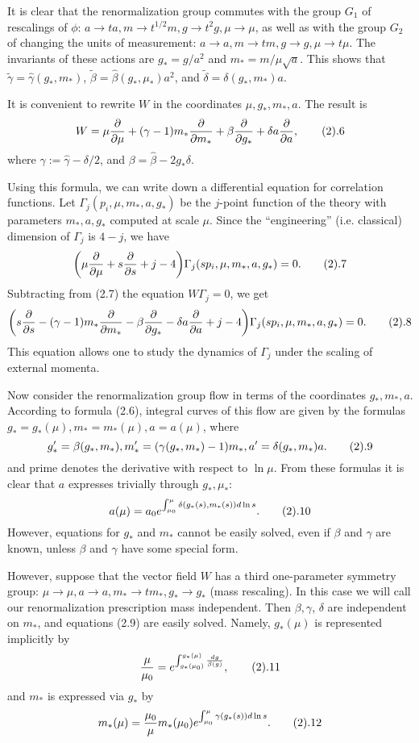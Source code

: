 It is clear that the renormalization group commutes with the group $G_1$ of
rescalings of $\phi$: $a\to ta, m\to t^{1/2}m,g\to t^2 g,\mu\to\mu$, 
as well as with 
the group $G_2$ of changing the units of measurement:
$a\to a,m\to tm,g\to g,\mu\to t\mu$. 
The invariants of these actions are $g_*=g/a^2$ and $m_*=m/\mu\sqrt{a}$. 
This shows that $\tilde\gamma=\hat\gamma(g_*,m_*)$, 
$\tilde\beta=\hat\beta(g_*,\mu_*)a^2$, and
$\tilde\delta=\delta(g_*,m_*)a$. 

It is convenient to rewrite $W$ in the coordinates $\mu,g_*,m_*,a$.
The result is 
$$
W=\mu\frac{\d}{\d\mu}+(\gamma-1) 
m_*\frac{\d}{\d m_*}+\beta
\frac{\d }{\d g_*}
+\delta a\frac{\d}{\d a},\tag 2.6
$$
where $\gamma:=\hat\gamma-\delta/2$, and
$\beta=\hat\beta-2g_*\delta$.

Using this formula, we can write down a differential equation 
for correlation functions.  
Let $\Gamma_j(p_i,\mu,m_*,a,g_*)$ be the $j$-point function
of the theory with parameters $m_*,a,g_*$ computed at scale $\mu$. 
Since the ``engineering'' (i.e. classical) dimension of $\Gamma_j$
is $4-j$, we have
$$
\biggl(\mu\frac{\d}{\d\mu}+s\frac{\d}{\d s}+j-4\biggr)
\Gamma_j(sp_i,\mu,m_*,a,g_*)=0.\tag 2.7
$$
Subtracting from (2.7) the equation $W\Gamma_j=0$, we get
$$
\biggl(s\frac{\d}{\d s}-(\gamma-1) 
m_*\frac{\d}{\d m_*}-\beta
\frac{\d }{\d g_*}
-\delta a\frac{\d}{\d a}+j-4\biggr)
\Gamma_j(sp_i,\mu,m_*,a,g_*)=0.\tag 2.8
$$
This equation allows one to study the dynamics of $\Gamma_j$ 
under the scaling of external momenta. 

Now consider the renormalization group flow in terms 
of the coordinates $g_*,m_*,a$. According to formula (2.6),
integral curves of this flow are given by 
the formulas $g_*=g_*(\mu),m_*=m_*(\mu), a=a(\mu)$, 
where
$$
g_*'=\beta(g_*,m_*), m_*'=(\gamma(g_*,m_*)-1)m_*, a'=\delta(g_*,m_*)a.\tag 2.9
$$
and prime denotes the derivative with respect to $\ln \mu$. 
{}From these formulas it is clear that $a$ expresses trivially 
through $g_*,\mu_*$:
$$
a(\mu)=a_0e^{\int_{\mu_0}^\mu\delta(g_*(s),m_*(s))d\ln s}.\tag 2.10
$$
However, equations for $g_*$ and $m_*$ cannot be easily solved,
even if $\beta$ and $\gamma$ are known, 
unless $\beta$ and $\gamma$ have some special form.

However, suppose that
the vector field $W$ has a third one-parameter symmetry
group: $\mu\to\mu,a\to a,m_*\to tm_*,g_*\to g_*$
(mass rescaling). In this case we will call our renormalization 
prescription mass independent.
Then $\beta,\gamma$, $\delta$ are independent on $m_*$, 
and equations
(2.9) are easily solved. Namely, $g_*(\mu)$ is 
represented implicitly by
$$
\frac{\mu}{\mu_0}=e^{\int_{g_*(\mu_0)}^{g_*(\mu)}\frac{dg}{\beta(g)}},\tag 2.11
$$  
and $m_*$ is expressed via $g_*$ by
$$
m_*(\mu)=\frac{\mu_0}{\mu}
m_*(\mu_0)e^{\int_{\mu_0}^\mu \gamma(g_*(s))d\ln s}.\tag 2.12
$$

